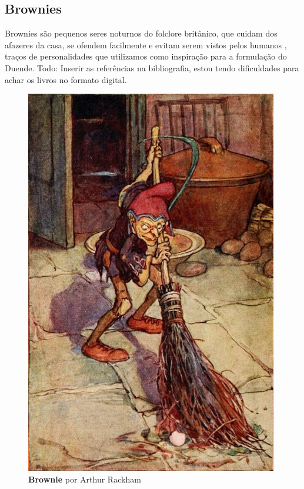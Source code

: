 \subsection{Brownies}
Brownies são pequenos seres noturnos do folclore britânico, que cuidam dos afazeres da casa, se ofendem facilmente e evitam serem vistos pelos humanos \cite{britannica_2011}, traços de personalidades que utilizamos como inspiração para a formulação do Duende.
Todo: Inserir as referências na bibliografia, estou tendo dificuldades para achar os livros no formato digital.
\begin{figure}[htb]
	\caption{\label{fig_grafico}\textbf{Brownie} por Arthur Rackham }
	\begin{center}
	    \includegraphics[scale=0.5]{imagens/brownie.jpg}
	\end{center}
\end{figure}
\vfill
\pagebreak


